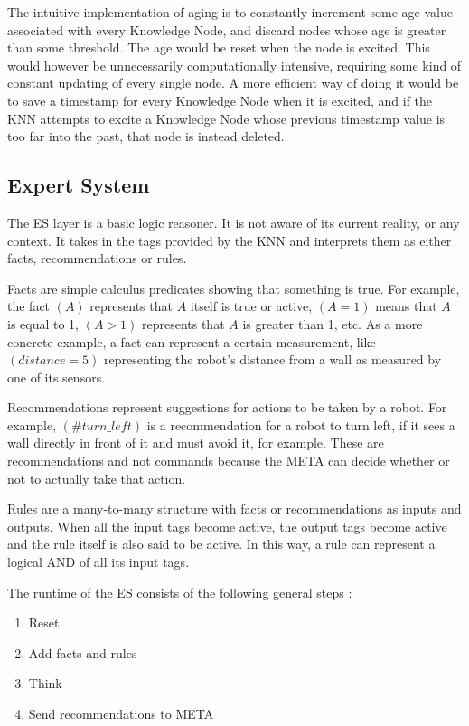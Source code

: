 \documentclass[titlepage,11pt]{article}
\begin{document}
The intuitive implementation of aging is to constantly increment some age value associated with every Knowledge Node, and discard nodes whose age is greater than some threshold. The age would be reset when the node is excited. This would however be unnecessarily computationally intensive, requiring some kind of constant updating of every single node. A more efficient way of doing it would be to save a timestamp for every Knowledge Node when it is excited, and if the KNN attempts to excite a Knowledge Node whose previous timestamp value is too far into the past, that node is instead deleted.

\subsection{Expert System}

The ES layer is a basic logic reasoner. It is not aware of its current reality, or any context. It takes in the tags provided by the KNN and interprets them as either facts, recommendations or rules.

Facts are simple calculus predicates showing that something is true. For example, the fact $(A)$ represents that $A$ itself is true or active, $(A = 1)$ means that $A$ is equal to 1, $(A > 1)$ represents that $A$ is greater than 1, etc. As a more concrete example, a fact can represent a certain measurement, like $(distance = 5)$ representing the robot's distance from a wall as measured by one of its sensors.

Recommendations represent suggestions for actions to be taken by a robot. For example, $(\#turn\_left)$ is a recommendation for a robot to turn left, if it sees a wall directly in front of it and must avoid it, for example. These are recommendations and not commands because the META can decide whether or not to actually take that action.

Rules are a many-to-many structure with facts or recommendations as inputs and outputs. When all the input tags become active, the output tags become active and the rule itself is also said to be active. In this way, a rule can represent a logical AND of all its input tags.

The runtime of the ES consists of the following general steps \cite{vybihal-expert}:

\begin{enumerate}
	\item Reset
	\item Add facts and rules
	\item Think
	\item Send recommendations to META
\end{enumerate}
\end{document}
